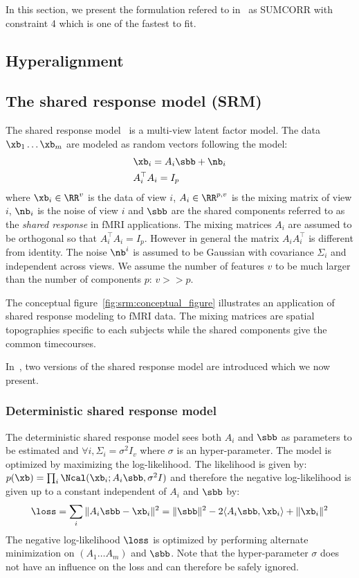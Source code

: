 In this section, we present the formulation refered to
in~\cite{nielsen2002multiset} as SUMCORR with constraint 4 which is one of the
fastest to fit.

\subsection{Hyperalignment}

\subsection{The shared response model (SRM)}
The shared response model~\cite{chen2015reduced} is a multi-view latent factor
model. The data $\xb_1 \dots \xb_m$ are modeled as random vectors following the model:
\begin{align}
 &\xb_i = A_i \sbb + \nb_i \\
  &A_i^{\top}A_i = I_p
  \label{eq:model:srm}
\end{align}
where $\xb_i \in \RR^v$ is the data of view $i$, $A_i \in \RR^{p, v}$ is the
mixing matrix of view $i$, $\nb_i$ is the noise of view $i$ and $\sbb$ are the
shared components referred to as the \emph{shared response} in fMRI applications.
The mixing matrices
$A_i$ are assumed to be orthogonal so that $A_i^{\top}A_i = I_p$. However in
general the matrix $A_i A_i^{\top}$ is different from identity. The noise
$\nb^i$ is assumed to be Gaussian with covariance $\Sigma_i$ and independent
across views. We assume the number of features $v$ to be much larger than the
number of components $p$: $v >> p$.

The conceptual figure~\ref{fig:srm:conceptual_figure} illustrates an 
application of shared response modeling to fMRI data. The mixing
matrices are spatial topographies specific to each subjects while the shared
components give the common timecourses.

In~\cite{chen2015reduced, anderson2016enabling}, two versions of the shared response model are
introduced which we now present.
\subsubsection{Deterministic shared response model}
The deterministic shared response model sees both $A_i$ and $\sbb$ as parameters to be
estimated and $\forall i, \Sigma_i=\sigma^2 I_v$ where $\sigma$ is an hyper-parameter.
The model is optimized by maximizing the log-likelihood.
The likelihood is given by: $p(\xb) = \prod_i \Ncal(\xb_i; A_i \sbb, \sigma^2 I)$ and
therefore the negative log-likelihood is given up to a constant independent of
$A_i$ and $\sbb$ by:
\begin{align}
  \loss = \sum_i \|A_i \sbb - \xb_i \|^2 = \| \sbb \|^2 -2 \langle A_i \sbb, \xb_i \rangle + \| \xb_i \|^2
  \label{eq:detsrmloss}
\end{align}
The negative log-likelihood $\loss$ is optimized by performing alternate minimization on $(A_1 \dots A_m)$
and $\sbb$. Note that the hyper-parameter $\sigma$ does not have an influence on
the loss and can therefore be safely ignored.

